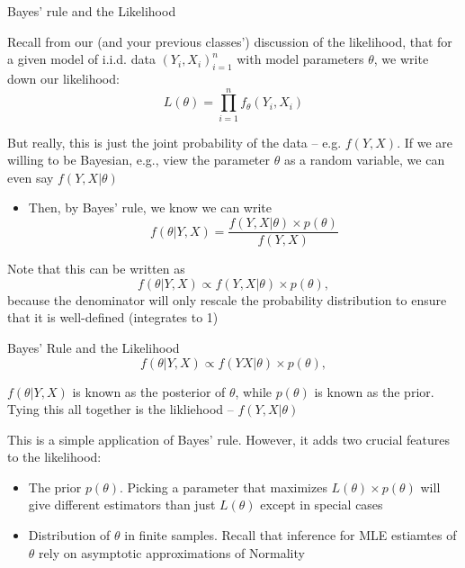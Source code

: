 \documentclass[notes,11pt, aspectratio=169]{beamer}
\newenvironment{wideitemize}{\itemize\addtolength{\itemsep}{10pt}}{\enditemize}
\begin{document}
\begin{frame}{Bayes' rule and the Likelihood}
  \begin{wideitemize}
  \item Recall from our (and your previous classes') discussion of the
    likelihood, that for a given model of i.i.d. data $(Y_{i},X_{i})_{i=1}^{n}$ with model parameters $\theta$, we write down our likelihood:
    \begin{equation*}
      L(\theta) = \prod_{i=1}^{n}f_{\theta}(Y_{i} , X_{i}) 
    \end{equation*}
  \item But really, this is just the joint probability of the data -- e.g. $f(Y , X)$. If we are willing to be Bayesian, e.g., view the parameter $\theta$ as a random variable, we can even say $f(Y , X |  \theta)$
    \begin{itemize}
    \item Then, by Bayes' rule, we know we can write
      \begin{equation*}
        f(\theta | Y, X) = \frac{f(Y , X | \theta) \times p(\theta)}{f(Y,X)}
      \end{equation*}
    \end{itemize}
    \item Note that this can be written as
      \begin{equation*}
        f(\theta | Y, X) \propto f(Y,  X | \theta) \times p(\theta),
      \end{equation*}
      because the denominator will only rescale the probability
      distribution to ensure that it is well-defined (integrates to 1)
  \end{wideitemize}
\end{frame}

\begin{frame}{Bayes' Rule and the Likelihood}
      \begin{equation*}
        f(\theta | Y, X) \propto f(Y X| \theta) \times p(\theta),
      \end{equation*}
  \begin{wideitemize}
  \item $f(\theta | Y, X)$ is known as the posterior of $\theta$,
    while $p(\theta)$ is known as the prior. Tying this all together is
    the likliehood -- $f(Y, X | \theta)$
  \item This is a simple application of Bayes' rule. However, it adds
    two crucial features to the likelihood:
    \begin{itemize}
    \item The prior $p(\theta)$. Picking a parameter that maximizes
      $L(\theta) \times p(\theta)$ will give different estimators than
      just $L(\theta)$ except in special cases
    \item Distribution of $\theta$ in finite samples. Recall that
      inference for MLE estiamtes of $\theta$ rely on asymptotic
      approximations of Normality
    \end{itemize}
  \end{wideitemize}
\end{frame}
\end{document}
